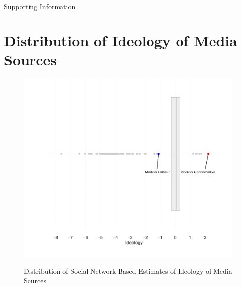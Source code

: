 \documentclass[12pt, letterpaper]{article}
\begin{document}
\clearpage
\normalfont
\normalsize
\doublespace



\clearpage

\appendix
\renewcommand{\thesection}{SI \arabic{section}}
\renewcommand\thetable{\thesection.\arabic{table}}
\renewcommand\thefigure{\thesection.\arabic{figure}}

\begin{center}
\Large{Supporting Information}
\end{center}

\section{Distribution of Ideology of Media Sources}
\label{full_dist}
\begin{figure}[h]
\centering
\caption{Distribution of Social Network Based Estimates of Ideology of Media Sources}
\includegraphics[scale=1]{../figs/boxplot_all_media_aug.pdf}
\label{fig:fig4}
\end{figure}

\clearpage
\end{document}
